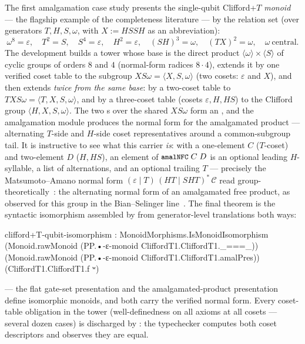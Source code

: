 The first amalgamation case study presents the single-qubit Clifford+$T$
\emph{monoid} --- the flagship example of the completeness literature
--- by the relation set (over generators $T, H, S, \omega$, with
$X := H S S H$ as an abbreviation):
\[
  \omega^8 = \varepsilon,\quad
  T^2 = S,\quad
  S^4 = \varepsilon,\quad
  H^2 = \varepsilon,\quad
  (SH)^3 = \omega,\quad
  (TX)^2 = \omega,\quad
  \omega\ \text{central}.
\]
The development builds a tower whose base is the direct product
$\langle \omega \rangle \times \langle S \rangle$ of cyclic groups of
orders $8$ and $4$ (normal-form radices $8 \cdot 4$), extends it by one
verified coset table to the subgroup
$\mathit{XS\omega} = \langle X, S, \omega \rangle$ (two cosets:
$\varepsilon$ and $X$), and then extends \emph{twice from the same base}:
by a two-coset table to
$\mathit{TXS\omega} = \langle T, X, S, \omega \rangle$, and by a
three-coset table (cosets $\varepsilon, H, HS$) to the Clifford group
$\langle H, X, S, \omega \rangle$.  The two s over
the shared $\mathit{XS\omega}$ form an , and the
amalgamation module produces the normal form for the amalgamated product
--- alternating $T$-side and $H$-side coset representatives around a
common-subgroup tail.  It is instructive to see what this carrier
\emph{is}: with a one-element $C$ ($T$-coset) and two-element $D$
($H, HS$), an element of $\mbox{\texttt{\small amalNFC}}\;C\;D$ is an optional leading
$H$-syllable, a list of alternations, and an optional trailing $T$ ---
precisely the Matsumoto--Amano normal form
$(\varepsilon \mid T)\,(HT \mid SHT)^{*}\,\mathcal{C}$ read
group-theoretically~\cite{matsumoto2008representation,giles2013remarks}:
the alternating normal form of an amalgamated free product, as observed
for this group in the Bian--Selinger
line~\cite{bian2023cliffordt2,bian2023thesis}.  The final theorem is the
syntactic isomorphism assembled by  from
generator-level translations both ways:

\begin{agdacode}
clifford+T-qubit-isomorphism :
  MonoidMorphisms.IsMonoidIsomorphism
    (Monoid.rawMonoid (PP.•-ε-monoid CliffordT1.CliffordT1._===_))
    (Monoid.rawMonoid (PP.•-ε-monoid CliffordT1.CliffordT1.amalPres))
    (CliffordT1.CliffordT1.f ʷ)
\end{agdacode}

--- the flat gate-set presentation and the amalgamated-product
presentation define isomorphic monoids, and both carry the verified
normal form.  Every coset-table obligation in the tower (well-definedness
on all axioms at all cosets --- several dozen cases) is discharged by
: the typechecker computes both coset
descriptors and observes they are equal.

